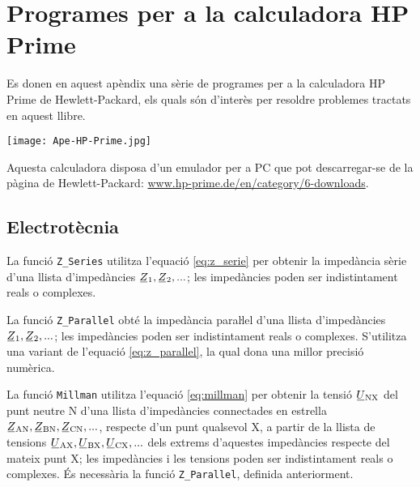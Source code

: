\chapter{Programes per a la calculadora \textsf{HP Prime}}\label{sec:progs-HP}

\lstset{
	language=HPPRIME,
	numbers=left,
	frame=lines
}

Es donen en aquest apèndix una sèrie de programes per a la calculadora \textsf{HP Prime} de Hewlett-Packard, els quals són d'interès per resoldre problemes tractats en aquest llibre.

\begin{center}
\texttt{[image: Ape-HP-Prime.jpg]}
\end{center}

Aquesta calculadora disposa d'un emulador per a PC que pot descarregar-se de la pàgina de Hewlett-Packard: \href{http://www.hp-prime.de/en/category/6-downloads}{www.hp-prime.de/en/category/6-downloads}.


\section{Electrotècnia}\label{sec:HP_ELC}

La funció \texttt{Z\_Series} utilitza l'equació \eqref{eq:z_serie} per obtenir la impedància sèrie d'una llista d'impedàncies $\cmplx{Z}_1, \cmplx{Z}_2, ...$; les impedàncies poden ser indistintament reals o complexes.




La funció \texttt{Z\_Parallel} obté la impedància paraŀlel  d'una llista d'impedàncies $\cmplx{Z}_1, \cmplx{Z}_2, ...$; les impedàncies poden ser indistintament reals o complexes. S'utilitza una variant de l'equació \eqref{eq:z_parallel}, la qual dona una millor precisió numèrica.




La funció \texttt{Millman} utilitza l'equació \eqref{eq:millman} per obtenir la tensió $\cmplx{U}\ped{NX}$ del punt neutre N d'una llista d'impedàncies connectades en estrella $\cmplx{Z}\ped{AN}, \cmplx{Z}\ped{BN}, \cmplx{Z}\ped{CN}, ...$, respecte d'un punt qualsevol X, a partir de la llista de tensions $\cmplx{U}\ped{AX}, \cmplx{U}\ped{BX}, \cmplx{U}\ped{CX}, ...$ dels extrems d'aquestes impedàncies respecte del mateix punt X; les impedàncies i les tensions poden ser indistintament reals o complexes. És necessària la funció \texttt{Z\_Parallel}, definida anteriorment.

